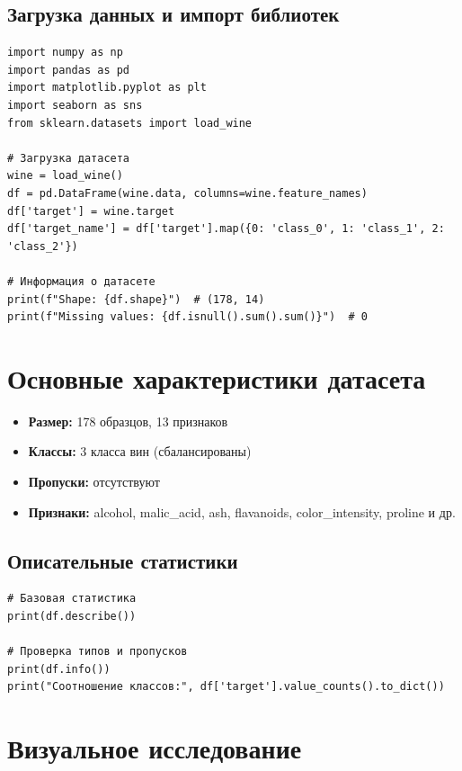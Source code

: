 \documentclass[a4paper,12pt]{article}
\begin{document}
\subsection*{Загрузка данных и импорт библиотек}
\begin{lstlisting}
import numpy as np
import pandas as pd
import matplotlib.pyplot as plt
import seaborn as sns
from sklearn.datasets import load_wine

# Загрузка датасета
wine = load_wine()
df = pd.DataFrame(wine.data, columns=wine.feature_names)
df['target'] = wine.target
df['target_name'] = df['target'].map({0: 'class_0', 1: 'class_1', 2: 'class_2'})

# Информация о датасете
print(f"Shape: {df.shape}")  # (178, 14)
print(f"Missing values: {df.isnull().sum().sum()}")  # 0
\end{lstlisting}

\section*{Основные характеристики датасета}

\begin{itemize}
    \item \textbf{Размер:} 178 образцов, 13 признаков
    \item \textbf{Классы:} 3 класса вин (сбалансированы)
    \item \textbf{Пропуски:} отсутствуют
    \item \textbf{Признаки:} alcohol, malic\_acid, ash, flavanoids, color\_intensity, proline и др.
\end{itemize}

\subsection*{Описательные статистики}
\begin{lstlisting}
# Базовая статистика
print(df.describe())

# Проверка типов и пропусков
print(df.info())
print("Соотношение классов:", df['target'].value_counts().to_dict())
\end{lstlisting}

\section*{Визуальное исследование}
\end{document}
